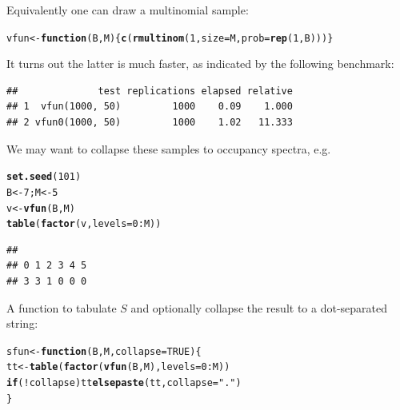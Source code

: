 \documentclass{article}\usepackage[]{graphicx}\usepackage[]{color}
\makeatletter
\newcommand{\hlnum}[1]{\textcolor[rgb]{0.686,0.059,0.569}{#1}}%
\newcommand{\hlstr}[1]{\textcolor[rgb]{0.192,0.494,0.8}{#1}}%
\newcommand{\hlopt}[1]{\textcolor[rgb]{0,0,0}{#1}}%
\newcommand{\hlstd}[1]{\textcolor[rgb]{0.345,0.345,0.345}{#1}}%
\newcommand{\hlkwa}[1]{\textcolor[rgb]{0.161,0.373,0.58}{\textbf{#1}}}%
\newcommand{\hlkwb}[1]{\textcolor[rgb]{0.69,0.353,0.396}{#1}}%
\newcommand{\hlkwc}[1]{\textcolor[rgb]{0.333,0.667,0.333}{#1}}%
\newcommand{\hlkwd}[1]{\textcolor[rgb]{0.737,0.353,0.396}{\textbf{#1}}}%
\newenvironment{kframe}{%
 \def\at@end@of@kframe{}%
 \ifinner\ifhmode%
  \def\at@end@of@kframe{\end{minipage}}%
  \begin{minipage}{\columnwidth}%
 \fi\fi%
 \def\FrameCommand##1{\hskip\@totalleftmargin \hskip-\fboxsep
 \colorbox{shadecolor}{##1}\hskip-\fboxsep
     \hskip-\linewidth \hskip-\@totalleftmargin \hskip\columnwidth}%
 \MakeFramed {\advance\hsize-\width
   \@totalleftmargin\z@ \linewidth\hsize
   \@setminipage}}%
 {\par\unskip\endMakeFramed%
 \at@end@of@kframe}
\newenvironment{knitrout}{}{} %
\makeatother
\begin{document}
Equivalently one can draw a multinomial sample:
\begin{knitrout}
\color{fgcolor}\begin{kframe}
\begin{alltt}
\hlstd{vfun} \hlkwb{<-} \hlkwa{function}\hlstd{(}\hlkwc{B}\hlstd{,}\hlkwc{M}\hlstd{) \{} \hlkwd{c}\hlstd{(}\hlkwd{rmultinom}\hlstd{(}\hlnum{1}\hlstd{,}\hlkwc{size}\hlstd{=M,}\hlkwc{prob}\hlstd{=}\hlkwd{rep}\hlstd{(}\hlnum{1}\hlstd{,B))) \}}
\end{alltt}
\end{kframe}
\end{knitrout}

It turns out the latter is much faster, as indicated
by the following benchmark:
\begin{knitrout}
\color{fgcolor}\begin{kframe}
\begin{verbatim}
##              test replications elapsed relative
## 1  vfun(1000, 50)         1000    0.09    1.000
## 2 vfun0(1000, 50)         1000    1.02   11.333
\end{verbatim}
\end{kframe}
\end{knitrout}

We may want to collapse these samples to occupancy spectra, e.g.
\begin{knitrout}
\color{fgcolor}\begin{kframe}
\begin{alltt}
\hlkwd{set.seed}\hlstd{(}\hlnum{101}\hlstd{)}
\hlstd{B} \hlkwb{<-} \hlnum{7}\hlstd{; M} \hlkwb{<-} \hlnum{5}
\hlstd{v} \hlkwb{<-} \hlkwd{vfun}\hlstd{(B,M)}
\hlkwd{table}\hlstd{(}\hlkwd{factor}\hlstd{(v,}\hlkwc{levels}\hlstd{=}\hlnum{0}\hlopt{:}\hlstd{M))}
\end{alltt}
\begin{verbatim}
## 
## 0 1 2 3 4 5 
## 3 3 1 0 0 0
\end{verbatim}
\end{kframe}
\end{knitrout}

A function to tabulate $S$ and optionally collapse the result
to a dot-separated string:
\begin{knitrout}
\color{fgcolor}\begin{kframe}
\begin{alltt}
\hlstd{sfun} \hlkwb{<-} \hlkwa{function}\hlstd{(}\hlkwc{B}\hlstd{,}\hlkwc{M}\hlstd{,}\hlkwc{collapse}\hlstd{=}\hlnum{TRUE}\hlstd{) \{}
    \hlstd{tt} \hlkwb{<-} \hlkwd{table}\hlstd{(}\hlkwd{factor}\hlstd{(}\hlkwd{vfun}\hlstd{(B,M),}\hlkwc{levels}\hlstd{=}\hlnum{0}\hlopt{:}\hlstd{M))}
    \hlkwa{if} \hlstd{(}\hlopt{!}\hlstd{collapse) tt} \hlkwa{else} \hlkwd{paste}\hlstd{(tt,}\hlkwc{collapse}\hlstd{=}\hlstr{"."}\hlstd{)}
\hlstd{\}}
\end{alltt}
\end{kframe}
\end{knitrout}
\end{document}

